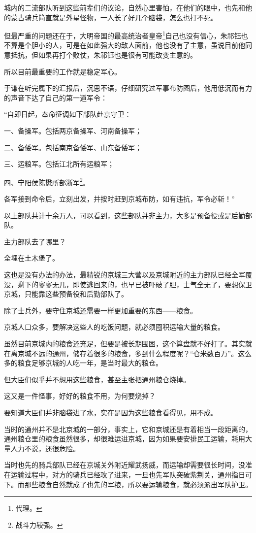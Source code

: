 \begin{multicols}{\theparacolNo}
城内的二流部队听到这些前辈们的议论，自然心里害怕，在他们的眼中，也先和他的蒙古骑兵简直就是外星怪物，一人长了好几个脑袋，怎么也打不死。

但最严重的问题还在于，大明帝国的最高统治者皇帝\footnote{代理。}自己也没有信心，朱祁钰也不算是个胆小的人，可是在如此强大的敌人面前，他也没有了主意，虽说目前他同意抵抗，但如果再打个败仗，朱祁钰也是很有可能改变主意的。

所以目前最重要的工作就是稳定军心。

于谦在听完属下的汇报后，沉思不语，仔细研究过军事布防图后，他用低沉而有力的声音下达了自己的第一道军令：

“自即日起，奉命征调如下部队赴京守卫：

一、备操军。包括两京备操军、河南备操军；

二、备倭军。包括南京备倭军、山东备倭军；

三、运粮军。包括江北所有运粮军；

四、宁阳侯陈懋所部浙军\footnote{战斗力较强。}。

各军接到命令后，立刻出发，并按时赶到京城布防，如有违抗，军令必斩！”

以上部队共计十余万人，可以看到，这些部队并非主力，大多是预备役或是后勤部队。

主力部队去了哪里？

全埋在土木堡了。

这也是没有办法的办法，最精锐的京城三大营以及京城附近的主力部队已经全军覆没，剩下的寥寥无几，即使逃回来的，也早已被吓破了胆，士气全无了，要想保卫京城，只能靠这些预备役和后勤部队了。

除了士兵外，要守住京城还需要一样更加重要的东西——粮食。

京城人口众多，要解决这些人的吃饭问题，就必须囤积运输大量的粮食。

虽然目前京城内的粮食还充足，但要是被长期围困，这个算盘就不好打了。其实就在离京城不远的通州，储存着很多的粮食，多到什么程度呢？“仓米数百万”。这么多的粮食足够京城的人吃一年，是当时最大的粮仓。

但大臣们似乎并不想用这些粮食，甚至主张把通州粮仓烧掉。

这又是一件怪事，好好的粮食不用，为何要烧掉？

要知道大臣们并非脑袋进了水，实在是因为这些粮食看得见，用不成。

当时的通州并不是北京城的一部分，事实上，它和京城还是有着相当一段距离的，通州粮仓里的粮食虽然很多，却很难运进京城，因为如果要安排民工运输，耗用大量人力不说，还很危险。

当时也先的骑兵部队已经在京城关外附近耀武扬威，而运输却需要很长时间，没准在运输过程中，对方的骑兵已经攻了进来，一旦也先军队突破紫荆关，通州指日可下。而那些粮食自然就成了也先的军粮，所以要运输粮食，就必须派出军队护卫。


\end{multicols}
